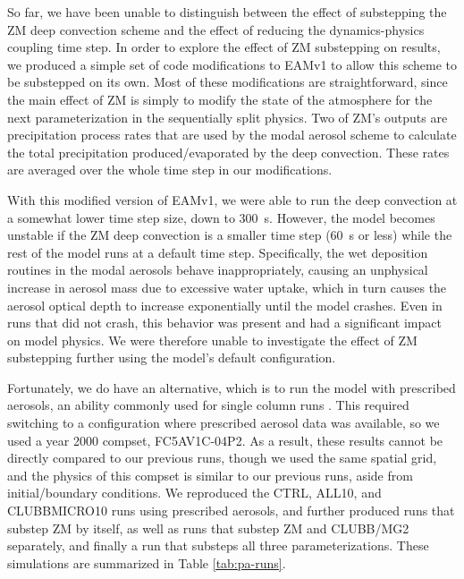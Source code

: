\documentclass [11pt, proquest] {uwthesis}[2020/02/24]
\begin{document}
\label{sec:zm-substep}

So far, we have been unable to distinguish between the effect of substepping the ZM deep convection scheme and the effect of reducing the dynamics-physics coupling time step. In order to explore the effect of ZM substepping on results, we produced a simple set of code modifications to EAMv1 to allow this scheme to be substepped on its own. Most of these modifications are straightforward, since the main effect of ZM is simply to modify the state of the atmosphere for the next parameterization in the sequentially split physics. Two of ZM's outputs are precipitation process rates that are used by the modal aerosol scheme to calculate the total precipitation produced/evaporated by the deep convection. These rates are averaged over the whole time step in our modifications.

With this modified version of EAMv1, we were able to run the deep convection at a somewhat lower time step size, down to \SI{300}{\second}. However, the model becomes unstable if the ZM deep convection is a smaller time step (\SI{60}{\second} or less) while the rest of the model runs at a default time step. Specifically, the wet deposition routines in the modal aerosols behave inappropriately, causing an unphysical increase in aerosol mass due to excessive water uptake, which in turn causes the aerosol optical depth to increase exponentially until the model crashes. Even in runs that did not crash, this behavior was present and had a significant impact on model physics. We were therefore unable to investigate the effect of ZM substepping further using the model's default configuration.

Fortunately, we do have an alternative, which is to run the model with prescribed aerosols, an ability commonly used for single column runs \parencite{LebassiHabtezion2015}. This required switching to a configuration where prescribed aerosol data was available, so we used a year \num{2000} compset, FC5AV1C-04P2. As a result, these results cannot be directly compared to our previous runs, though we used the same spatial grid, and the physics of this compset is similar to our previous runs, aside from initial/boundary conditions. We reproduced the CTRL, ALL10, and CLUBBMICRO10 runs using prescribed aerosols, and further produced runs that substep ZM by itself, as well as runs that substep ZM and CLUBB/MG2 separately, and finally a run that substeps all three parameterizations. These simulations are summarized in Table \ref{tab:pa-runs}.
\end{document}
